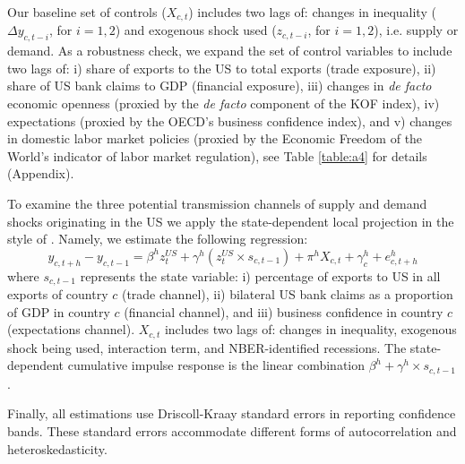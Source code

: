 \documentclass[12pt, a4paper]{article}
\begin{document}
Our baseline set of controls ($X_{c,t}$) includes two lags of: changes in inequality ($\Delta y_{c,t-i}$, for $i =1,2$) and exogenous shock used ($z_{c,t-i}$, for $i =1,2$), i.e. supply or demand. As a robustness check, we expand the set of control variables to include two lags of: i) share of exports to the US to total exports (trade exposure), ii) share of US bank claims to GDP (financial exposure), iii) changes in \textit{de facto} economic openness (proxied by the \textit{de facto} component of the KOF index), iv) expectations (proxied by the OECD's business confidence index), and v) changes in domestic labor market policies (proxied by the Economic Freedom of the World's indicator of labor market regulation), see Table \ref{table:a4} for details (Appendix).

To examine the three potential transmission channels of supply and demand shocks originating in the US we apply the state-dependent local projection in the style of \textcite{auerbach2013output}. Namely, we estimate the following regression:
\begin{equation}
    y_{c,t+h}-y_{c,t-1} = \beta^h z^{US}_{t} + \gamma^h (z^{US}_{t} \times s_{c,t-1}) + \pi^h X_{c,t} + \gamma^h_c + e^h_{c, t+h}
\label{eq:2}
\end{equation}
where $s_{c,t-1}$ represents the state variable: i) percentage of exports to US in all exports of country $c$ (trade channel), ii) bilateral US bank claims as a proportion of GDP in country $c$ (financial channel), and iii) business confidence in country $c$ (expectations channel). $X_{c,t}$ includes two lags of: changes in inequality, exogenous shock being used, interaction term, and NBER-identified recessions. The state-dependent cumulative impulse response is the linear combination $\beta^h + \gamma^h \times s_{c,t-1}$.

Finally, all estimations use Driscoll-Kraay standard errors in reporting confidence bands. These standard errors accommodate different forms of autocorrelation and heteroskedasticity.

\end{document}

